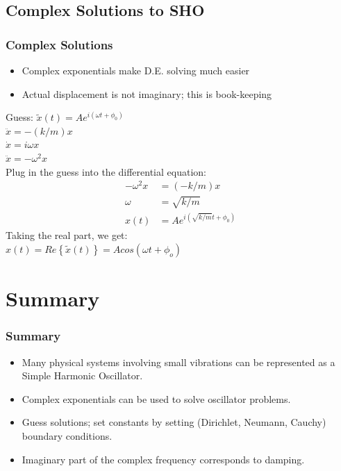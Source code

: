 \documentclass[pdf,hideothersubsections]{beamer}
\begin{document}
\subsection{Complex Solutions to SHO}
\begin{frame}
\frametitle{Complex Solutions}
\begin{itemize}
\item Complex exponentials make D.E. solving much easier
\pause
\item Actual displacement is not imaginary; this is book-keeping
\pause
\end{itemize}
Guess: $\tilde{x}(t) = A e^{i (\omega t + \phi_0)}$ \\
\pause
$\ddot{x} = -(k/m) x$ \\
\pause
$\dot{x} = i \omega x$ \\
\pause
$\ddot{x} = -\omega^2 x$ \\
Plug in the guess into the differential equation:
\begin{align*}
-\omega^2 x &= (-k/m) x \\
\omega &= \sqrt{k/m} \\
x(t) &= A e^{i (\sqrt{k/m} t + \phi_0)}
\end{align*}
\pause
Taking the real part, we get: \\
\pause
$x(t) = Re\left\{\tilde{x}(t)\right\} = A cos(\omega t + \phi_o)$

\end{frame}


\section{Summary}
\begin{frame}
\frametitle{Summary}
\begin{itemize}
\item Many physical systems involving small vibrations can be represented as a Simple Harmonic Oscillator.
\pause
\item Complex exponentials can be used to solve oscillator problems.
\pause
\item Guess solutions; set constants by setting (Dirichlet, Neumann, Cauchy) boundary conditions.
\pause
\item Imaginary part of the complex frequency corresponds to damping.
\end{itemize}
\end{frame}
\end{document}
